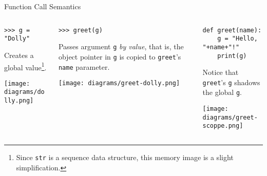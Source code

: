 \documentclass[smaller, aspectratio=1610]{beamer}
\begin{document}
\begin{frame}[label={sec:org49537f8},fragile]{Function Call Semantics}
 \begin{columns}
\begin{column}{0.3\columnwidth}
\begin{block}{}
\lstset{language=Python,label= ,caption= ,captionpos=b,numbers=none}
\begin{lstlisting}
>>> g = "Dolly"
\end{lstlisting}

Creates a global value\footnote{Since \texttt{str} is a sequence data structure, this memory image is a slight simplification.}.

\begin{center}
\texttt{[image: diagrams/dolly.png]}
\end{center}
\end{block}
\end{column}

\begin{column}{0.3\columnwidth}
\begin{block}{}
\lstset{language=Python,label= ,caption= ,captionpos=b,numbers=none}
\begin{lstlisting}
>>> greet(g)
\end{lstlisting}

Passes argument \texttt{g} \emph{by value}, that is, the object pointer in \texttt{g} is copied to \texttt{greet}'s \texttt{name} parameter.

\begin{center}
\texttt{[image: diagrams/greet-dolly.png]}
\end{center}
\end{block}
\end{column}


\begin{column}{0.3\columnwidth}
\begin{block}{}
\lstset{language=Python,label= ,caption= ,captionpos=b,numbers=none,basicstyle=\ttfamily\scriptsize, numbers=left}
\begin{lstlisting}
def greet(name):
    g = "Hello, "+name+"!"
    print(g)
\end{lstlisting}

Notice that \texttt{greet}'s \texttt{g} shadows the global \texttt{g}.
\begin{center}
\texttt{[image: diagrams/greet-scoppe.png]}
\end{center}
\end{block}
\end{column}
\end{columns}
\end{frame}
\end{document}
